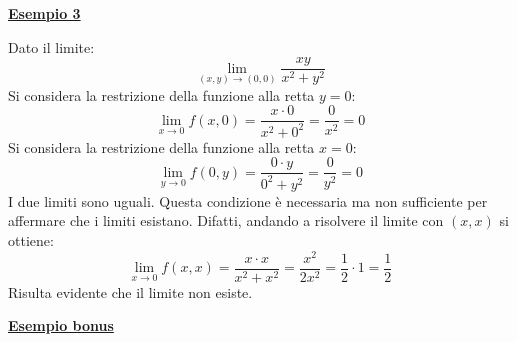 \documentclass[a4paper]{article}
\newcommand{\example}[1]{\textcolor{Green4}{\textbf{#1}}}
\begin{document}
	\begin{flushleft}
		\example{\underline{Esempio 3}}
	\end{flushleft}
	Dato il limite:
	\begin{equation*}
		\displaystyle\lim_{\left(x,y\right) \rightarrow \left(0,0\right)} \dfrac{xy}{x^{2}+y^{2}}
	\end{equation*}
	Si considera la restrizione della funzione alla retta $y=0$:
	\begin{equation*}
		\displaystyle\lim_{x \rightarrow 0} f\left(x,0\right) = \dfrac{x \cdot 0}{x^{2}+0^{2}} = \dfrac{0}{x^{2}} = 0
	\end{equation*}
	Si considera la restrizione della funzione alla retta $x=0$:
	\begin{equation*}
		\displaystyle\lim_{y \rightarrow 0} f\left(0,y\right) = \dfrac{0 \cdot y}{0^{2} + y^{2}} = \dfrac{0}{y^{2}} = 0
	\end{equation*}
	I due limiti sono uguali. Questa condizione è necessaria ma non sufficiente per affermare che i limiti esistano. Difatti, andando a risolvere il limite con $\left(x,x\right)$ si ottiene:
	\begin{equation*}
		\displaystyle\lim_{x \rightarrow 0}f\left(x,x\right) = \dfrac{x \cdot x}{x^{2} + x^{2}} = \dfrac{x^{2}}{2x^{2}} = \dfrac{1}{2} \cdot 1 = \dfrac{1}{2}
	\end{equation*}
	Risulta evidente che il limite non esiste.\newpage

	\begin{flushleft}
		\example{\underline{Esempio bonus}}
	\end{flushleft}
\end{document}
